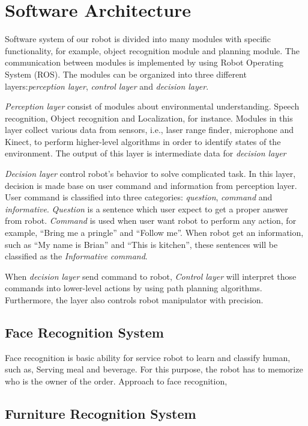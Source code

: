 \documentclass{llncs}
\newcommand{\dq}[1]{``#1''}
\begin{document}
\section{Software Architecture}
Software system of our robot is divided into many modules with specific functionality, for example, object recognition module and planning module. The communication between modules is implemented by using Robot Operating System (ROS). The modules can be organized into three different layers:\textit{perception layer}, \textit{control layer} and \textit{decision layer}.

\textit{Perception layer} consist of modules about environmental understanding. Speech recognition, Object recognition and Localization, for instance. Modules in this layer collect various data from sensors, i.e., laser range finder, microphone and Kinect, to perform higher-level algorithms in order to identify states of the environment. The output of this layer is intermediate data for \textit{decision layer}

\textit{Decision layer} control robot's behavior to solve complicated task. In this layer, decision is made base on user command and information from perception layer. User command is classified into three categories: \textit{question}, \textit{command} and \textit{informative}. \textit{Question} is a sentence which user expect to get a proper answer from robot. \textit{Command} is used when user want robot to perform any action, for example, \dq{Bring me a pringle} and \dq{Follow me}. When robot get an information, such as \dq{My name is Brian} and \dq{This is kitchen}, these sentences will be classified as the \textit{Informative command}.

When \textit{decision layer} send command to robot, \textit{Control layer} will interpret those commands into lower-level actions by using path planning algorithms. Furthermore, the layer also controls robot manipulator with precision.

\subsection{Face Recognition System}

Face recognition is basic ability for service robot to learn and classify human, such as, Serving meal and beverage. For this purpose, the robot has to memorize who is the owner of the order. Approach to face recognition, 

\subsection{Furniture Recognition System}
\end{document}
